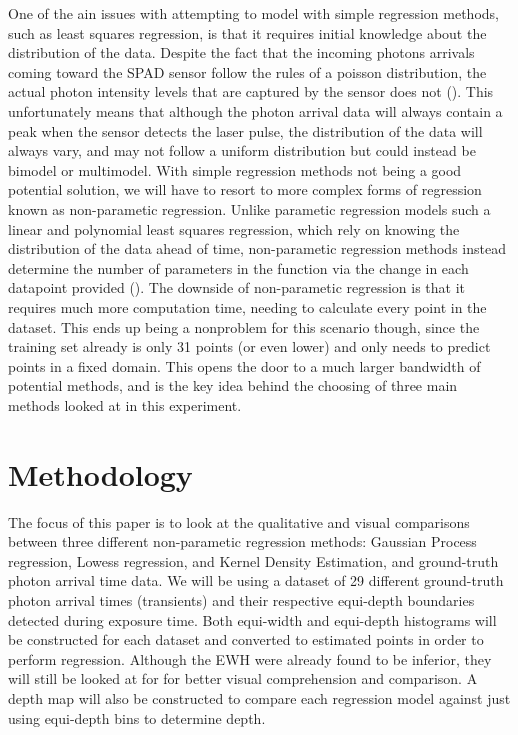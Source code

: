 \documentclass[letterpaper,12pt]{article}
\begin{document}
One of the ain issues with attempting to model with simple regression methods, such as 
least squares regression, is that it requires initial knowledge about the distribution of
the data. Despite the fact that the incoming photons arrivals coming toward the SPAD sensor 
follow the rules of a poisson distribution, the actual photon intensity levels that are captured 
by the sensor does not (\cite{ingle2019high}). This unfortunately means that although the 
photon arrival data will always contain a peak when the sensor detects the laser pulse, the
distribution of the data will always vary, and may not follow a uniform distribution but
could instead be bimodel or multimodel. With simple regression methods not being a good 
potential solution, we will have to resort to more complex forms of regression known
as non-parametic regression. Unlike parametic regression models such a linear and polynomial
least squares regression, which rely on knowing the distribution of the data ahead of time,
non-parametic regression methods instead determine the number of parameters in the function
via the change in each datapoint provided (\cite{mahoud2019parametic}). The downside of 
non-parametic regression is that it requires much more computation time, needing to calculate
every point in the dataset. This ends up being a nonproblem for this scenario though,
since the training set already is only 31 points (or even lower) and only needs to predict
points in a fixed domain. This opens the door to a much larger bandwidth of potential methods, 
and is the key idea behind the choosing of three main methods looked at in this experiment.

\section{Methodology}
The focus of this paper is to look at the qualitative and visual comparisons between
three different non-parametic regression methods: Gaussian Process regression, Lowess
regression, and Kernel Density Estimation, and ground-truth photon arrival time data.
We will be using a dataset of 29 different ground-truth photon arrival times
(transients) and their respective equi-depth boundaries detected during exposure time.
Both equi-width and equi-depth histograms will be constructed for each dataset and converted
to estimated points in order to perform regression. Although the EWH were already found
to be inferior, they will still be looked at for for better visual comprehension and 
comparison. A depth map will also be constructed to compare each regression model
against just using equi-depth bins to determine depth.
\end{document}
